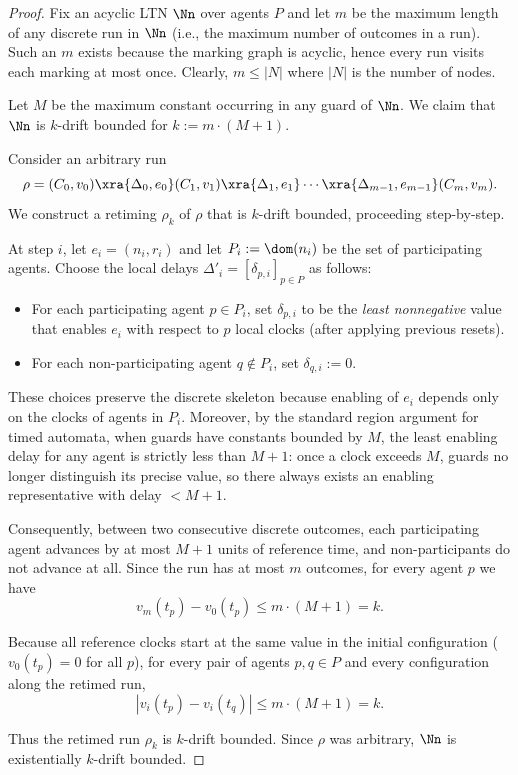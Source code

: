 \begin{proof}
Fix an acyclic LTN $\Nn$ over agents $P$ and let $m$ be the maximum length of any discrete run in $\Nn$ (i.e., the maximum number of outcomes in a run). Such an $m$ exists because the marking graph is acyclic, hence every run visits each marking at most once. Clearly, $m \le |N|$ where $|N|$ is the number of nodes.

Let $M$ be the maximum constant occurring in any guard of $\Nn$. We claim that $\Nn$ is $k$-drift bounded for $k := m \cdot (M+1)$.

Consider an arbitrary run
\[
\rho = (C_0,v_0) \xra{\Delta_0,e_0} (C_1,v_1) \xra{\Delta_1,e_1} \cdots \xra{\Delta_{m-1},e_{m-1}} (C_m,v_m).
\]
We construct a retiming $\rho_k$ of $\rho$ that is $k$-drift bounded, proceeding step-by-step.

At step $i$, let $e_i = (n_i, r_i)$ and let $P_i := \dom(n_i)$ be the set of participating agents. Choose the local delays $\Delta'_i = [\delta_{p,i}]_{p \in P}$ as follows:
\begin{itemize}
\item For each participating agent $p \in P_i$, set $\delta_{p,i}$ to be the \emph{least nonnegative} value that enables $e_i$ with respect to $p$ local clocks (after applying previous resets).
\item For each non-participating agent $q \notin P_i$, set $\delta_{q,i} := 0$.
\end{itemize}

These choices preserve the discrete skeleton because enabling of $e_i$ depends only on the clocks of agents in $P_i$. Moreover, by the standard region argument for timed automata, when guards have constants bounded by $M$, the least enabling delay for any agent is strictly less than $M+1$: once a clock exceeds $M$, guards no longer distinguish its precise value, so there always exists an enabling representative with delay $ < M+1$.

Consequently, between two consecutive discrete outcomes, each participating agent advances by at most $M+1$ units of reference time, and non-participants do not advance at all. Since the run has at most $m$ outcomes, for every agent $p$ we have
\[
v_m(t_p) - v_0(t_p) \le m \cdot (M+1) = k.
\]

Because all reference clocks start at the same value in the initial configuration ($v_0(t_p) = 0$ for all $p$), for every pair of agents $p, q \in P$ and every configuration along the retimed run,
\[
|v_i(t_p) - v_i(t_q)| \le m \cdot (M+1) = k.
\]

Thus the retimed run $\rho_k$ is $k$-drift bounded. Since $\rho$ was arbitrary, $\Nn$ is existentially $k$-drift bounded.
\end{proof}

